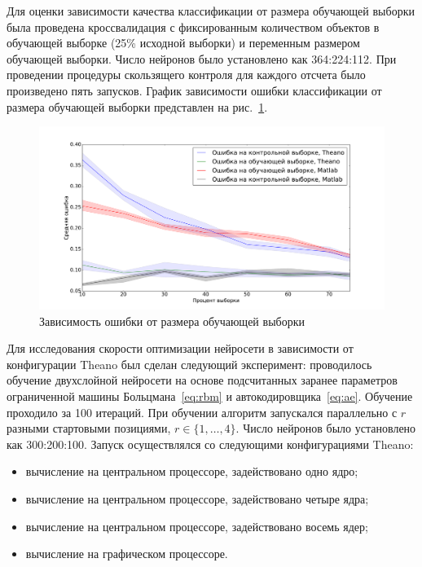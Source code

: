 Для оценки зависимости качества классификации от размера обучающей выборки была проведена кроссвалидация с фиксированным количеством объектов в обучающей выборке (25\% исходной выборки) и переменным размером обучающей выборки. Число нейронов было установлено как 364:224:112. При проведении процедуры скользящего контроля для каждого отсчета было произведено пять запусков. График зависимости ошибки классификации от размера обучающей выборки представлен на рис.~\ref{fig:samples}.


\begin{figure}[tb!]
 \centering
  \includegraphics[width=1.0\textwidth]{plots/popova/samples.pdf}
 \caption{Зависимость ошибки от размера обучающей выборки}
 \label{fig:samples}
\end{figure}


Для исследования скорости оптимизации нейросети в зависимости от конфигурации Theano был сделан следующий эксперимент:
проводилось обучение двухслойной нейросети на основе подсчитанных заранее параметров ограниченной машины Больцмана~\eqref{eq:rbm} и автокодировщика~\eqref{eq:ae}. Обучение проходило за 100 итераций. При обучении алгоритм запускался параллельно с $r$ разными стартовыми позициями, $r \in \{1,\dots,4\}.$ Число нейронов было установлено как 300:200:100.
Запуск осуществлялся со следующими конфигурациями Theano:
\begin{itemize}
\item вычисление на центральном процессоре, задействовано
одно ядро;
\item вычисление на центральном процессоре, задействовано четыре ядра;
\item вычисление на центральном процессоре, задействовано восемь ядер;
\item вычисление на графическом процессоре.
\end{itemize}


